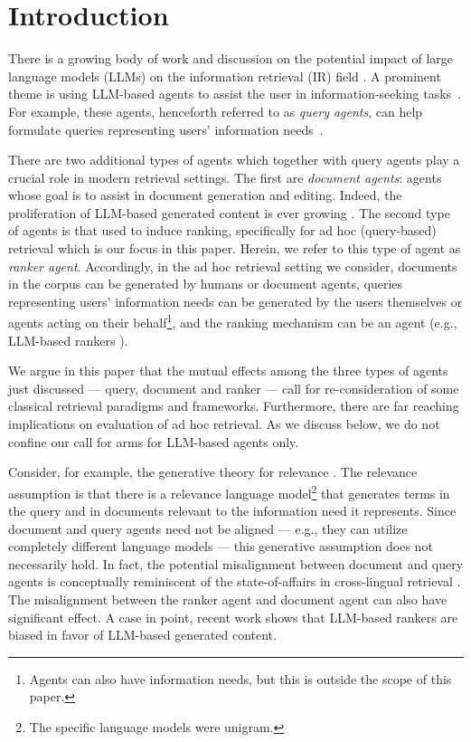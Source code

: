 
\section{Introduction}
There is a growing body of work and discussion on the potential impact
of large language models (LLMs) on the information retrieval (IR)
field \cite{Chen+al:21a,White:25a,Zhai:24a,Zhu+al:24a}. 
A prominent theme is using LLM-based agents to assist the user in information-seeking tasks~\cite{Chen+al:21a,Shah+White:24a,White:25a,Zhai:24a,Zhang+al:24a}. 
For example, these agents, henceforth referred to as {\em query agents}, can help formulate queries representing users’ information needs~\cite{Chen+al:21a,Shah+White:24a,White:25a,Zhai:24a}.

There are two additional types of agents which together with query
agents play a crucial role in modern retrieval
settings. The first are {\em document agents}: agents whose goal is to
assist in document generation and editing. Indeed, the proliferation
of LLM-based generated content is ever growing
\cite{ai-generated-social-media}. The second type of agents is that
used to induce ranking, specifically for ad hoc (query-based) retrieval which
is our focus in this paper. Herein, we refer to this type of agent as
{\em ranker agent}. Accordingly, in the ad hoc retrieval setting we
consider, documents in the corpus can be generated by humans or
document agents, queries representing users' information needs can be
generated by the users themselves or agents acting on their behalf\footnote{Agents can also have information needs, but this 
  is outside the scope of this paper.}, and the ranking mechanism can be an agent (e.g., LLM-based rankers
\cite{liang2022holistic,qin2024pairwise,zhuang2024setwise}).

We argue in this paper
that the mutual effects among the three types of agents just discussed --- query, document and ranker --- call for
re-consideration of
some classical retrieval paradigms and frameworks. Furthermore, there are far
reaching implications on evaluation of ad hoc retrieval. As we discuss below, we do not confine our call for arms for LLM-based agents only.

Consider, for example, the generative theory for relevance
\cite{Lavrenko+Croft:01a,lavrenko-rm-book}. The relevance assumption is
that there is a relevance language model\footnote{The specific language
  models were unigram.} that generates terms in the query and in
documents relevant to the information need it represents. Since
document and query agents need not be aligned --- e.g., they can
utilize completely different language models --- this generative
assumption does not necessarily hold. In fact, the potential
misalignment between document and query agents is conceptually
reminiscent of the state-of-affairs in cross-lingual retrieval
\cite{Lavrenko+al:02a}. The misalignment between the ranker agent and document agent can also have significant effect. A case in point, recent work \cite{neural-llm-bias,dai2024cocktail}
shows that LLM-based rankers are biased in favor of LLM-based
generated content.

